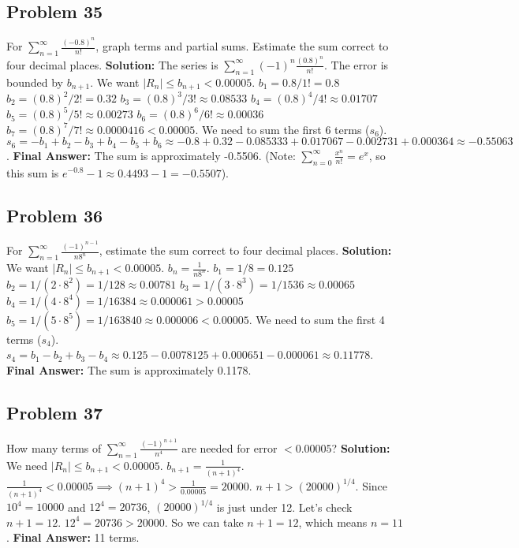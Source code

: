 \documentclass{article}
\begin{document}
\subsection*{Problem 35}
For $\sum_{n=1}^{\infty} \frac{(-0.8)^n}{n!}$, graph terms and partial sums. Estimate the sum correct to four decimal places.
\textbf{Solution:} The series is $\sum_{n=1}^{\infty} (-1)^n \frac{(0.8)^n}{n!}$.
The error is bounded by $b_{n+1}$. We want $|R_n| \le b_{n+1} < 0.00005$.
$b_1 = 0.8/1! = 0.8$
$b_2 = (0.8)^2/2! = 0.32$
$b_3 = (0.8)^3/3! \approx 0.08533$
$b_4 = (0.8)^4/4! \approx 0.01707$
$b_5 = (0.8)^5/5! \approx 0.00273$
$b_6 = (0.8)^6/6! \approx 0.00036$
$b_7 = (0.8)^7/7! \approx 0.0000416 < 0.00005$.
We need to sum the first 6 terms ($s_6$).
$s_6 = -b_1 + b_2 - b_3 + b_4 - b_5 + b_6 \approx -0.8 + 0.32 - 0.085333 + 0.017067 - 0.002731 + 0.000364 \approx -0.55063$.
\textbf{Final Answer:} The sum is approximately -0.5506. (Note: $\sum_{n=0}^\infty \frac{x^n}{n!} = e^x$, so this sum is $e^{-0.8}-1 \approx 0.4493-1 = -0.5507$).

\subsection*{Problem 36}
For $\sum_{n=1}^{\infty} \frac{(-1)^{n-1}}{n 8^n}$, estimate the sum correct to four decimal places.
\textbf{Solution:} We want $|R_n| \le b_{n+1} < 0.00005$.
$b_n = \frac{1}{n 8^n}$.
$b_1 = 1/8 = 0.125$
$b_2 = 1/(2 \cdot 8^2) = 1/128 \approx 0.00781$
$b_3 = 1/(3 \cdot 8^3) = 1/1536 \approx 0.00065$
$b_4 = 1/(4 \cdot 8^4) = 1/16384 \approx 0.000061 > 0.00005$
$b_5 = 1/(5 \cdot 8^5) = 1/163840 \approx 0.000006 < 0.00005$.
We need to sum the first 4 terms ($s_4$).
$s_4 = b_1 - b_2 + b_3 - b_4 \approx 0.125 - 0.0078125 + 0.000651 - 0.000061 \approx 0.11778$.
\textbf{Final Answer:} The sum is approximately 0.1178.

\subsection*{Problem 37}
How many terms of $\sum_{n=1}^{\infty} \frac{(-1)^{n+1}}{n^4}$ are needed for error $< 0.00005$?
\textbf{Solution:} We need $|R_n| \le b_{n+1} < 0.00005$.
$b_{n+1} = \frac{1}{(n+1)^4}$.
$\frac{1}{(n+1)^4} < 0.00005 \implies (n+1)^4 > \frac{1}{0.00005} = 20000$.
$n+1 > (20000)^{1/4}$. Since $10^4=10000$ and $12^4=20736$, $(20000)^{1/4}$ is just under 12. Let's check $n+1=12$.
$12^4 = 20736 > 20000$. So we can take $n+1=12$, which means $n=11$.
\textbf{Final Answer:} 11 terms.
\end{document}
